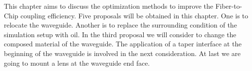 This chapter aims to discuss the optimization methods to improve the Fiber-to-Chip coupling efficiency. Five proposals will be obtained in this chapter. One is to relocate the waveguide. Another is to replace the surrounding condition of the simulation setup with oil. In the third proposal we will consider to change the composed material of the waveguide.  The application of a taper interface at the beginning of the waveguide is involved in the next consideration. At last we are going to mount a lens at the waveguide end face.
